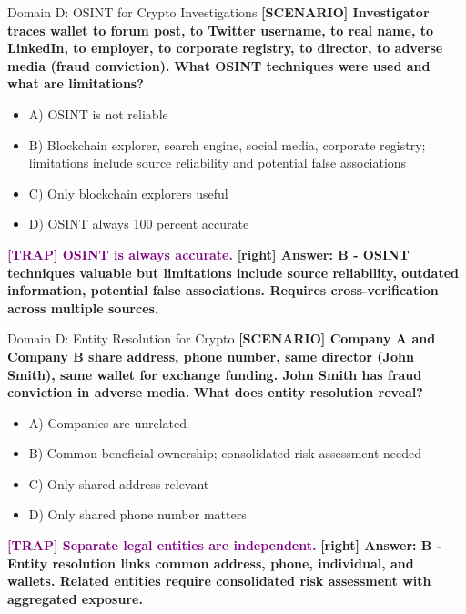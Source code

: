 \documentclass[11pt,a4paper]{beamer}
\newcommand{\trap}[1]{\textcolor{purple}{\textbf{[TRAP] #1}}}
\newcommand{\correct}[1]{\textcolor{green!50!black}{\textbf{[right] #1}}}
\newcommand{\scenario}[1]{\textcolor{blue!70!black}{\textbf{[SCENARIO] #1}}}
\begin{document}
\begin{frame}{Domain D: OSINT for Crypto Investigations}
\scenario{Investigator traces wallet to forum post, to Twitter username, to real name, to LinkedIn, to employer, to corporate registry, to director, to adverse media (fraud conviction).}
\vspace{0.2cm}
\textbf{What OSINT techniques were used and what are limitations?}
\vspace{0.2cm}
\begin{itemize}
    \item A) OSINT is not reliable
    \item B) Blockchain explorer, search engine, social media, corporate registry; limitations include source reliability and potential false associations
    \item C) Only blockchain explorers useful
    \item D) OSINT always 100 percent accurate
\end{itemize}
\vspace{0.2cm}
\trap{OSINT is always accurate.}
\correct{Answer: B - OSINT techniques valuable but limitations include source reliability, outdated information, potential false associations. Requires cross-verification across multiple sources.}
\end{frame}

\begin{frame}{Domain D: Entity Resolution for Crypto}
\scenario{Company A and Company B share address, phone number, same director (John Smith), same wallet for exchange funding. John Smith has fraud conviction in adverse media.}
\vspace{0.2cm}
\textbf{What does entity resolution reveal?}
\vspace{0.2cm}
\begin{itemize}
    \item A) Companies are unrelated
    \item B) Common beneficial ownership; consolidated risk assessment needed
    \item C) Only shared address relevant
    \item D) Only shared phone number matters
\end{itemize}
\vspace{0.2cm}
\trap{Separate legal entities are independent.}
\correct{Answer: B - Entity resolution links common address, phone, individual, and wallets. Related entities require consolidated risk assessment with aggregated exposure.}
\end{frame}
\end{document}
